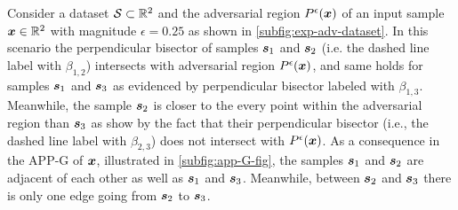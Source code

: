 \begin{example}
\label{exp:app-g}
Consider a dataset $\mathcal{S} \subset \R[2]$ and the adversarial region $\pert$ of an input sample $\vinput \in \R[2]$ with magnitude $\epsilon = 0.25$ as shown in \autoref{subfig:exp-adv-dataset}. In this scenario the perpendicular bisector of samples $\sample[1]$ and $\sample[2]$ (i.e. the dashed line label with $\beta_{1,2}$) intersects with adversarial region $\pert$, and same holds for samples $\sample[1]$ and $\sample[3]$ as evidenced by perpendicular bisector labeled with $\beta_{1,3}$. Meanwhile, the sample $\sample[2]$ is closer to the every point within the adversarial region than $\sample[3]$ as show by the fact that their perpendicular bisector (i.e., the dashed line label with $\beta_{2,3}$) does not intersect with $\pert$. As a consequence in the \acs{APP-G} of $\vinput$, illustrated in \autoref{subfig:app-G-fig}, the samples $\sample[1]$ and $\sample[2]$ are adjacent of each other as well as $\sample[1]$ and $\sample[3]$. Meanwhile, between $\sample[2]$ and $\sample[3]$ there is only one edge going from $\sample[2]$ to $\sample[3]$.

\begin{figure}[h]
  \centering
  \begin{subfigure}{0.5\linewidth}
\end{subfigure}
\end{figure}
\end{example}
